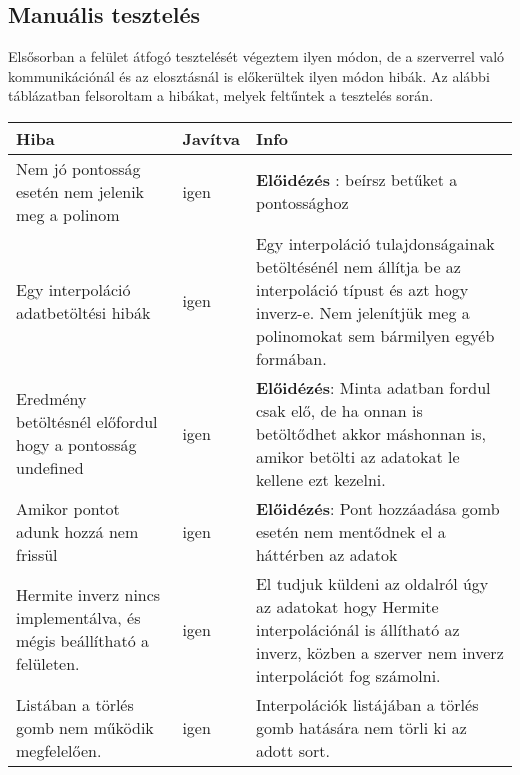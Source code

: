 \subsection{Manuális tesztelés}
	Elsősorban a felület átfogó tesztelését végeztem ilyen módon, de a szerverrel való kommunikációnál és az elosztásnál is előkerültek ilyen módon hibák. \newline
	Az alábbi táblázatban felsoroltam a hibákat, melyek feltűntek a tesztelés során. 
	\begin{center}
  	\begin{tabular}{| p{4cm} | p{1.5cm} | p{8cm} |}
    \hline
    Hiba & Javítva & Info
  	\\ \hline
        Nem jó pontosság esetén nem jelenik meg a polinom
      &
      	igen
      &
		\textbf{Előidézés} : beírsz betűket a pontossághoz 
    \\ \hline
        Egy interpoláció adatbetöltési hibák
      &
      	igen
      &
      	Egy interpoláció tulajdonságainak betöltésénél nem állítja be az interpoláció típust és azt hogy inverz-e.
      	Nem jelenítjük meg a polinomokat sem bármilyen egyéb formában.
    \\ \hline
        Eredmény betöltésnél előfordul hogy a pontosság undefined 
      &
      	igen
      &
		\textbf{Előidézés}:  Minta adatban fordul csak elő, de ha onnan  is betöltődhet akkor máshonnan is, amikor betölti az adatokat le kellene ezt kezelni.
   \\ \hline
    	Amikor pontot adunk hozzá nem frissül 
      &
      	igen
      &
		\textbf{Előidézés}: Pont hozzáadása gomb esetén nem mentődnek el a háttérben az adatok
    \\ \hline
    	Hermite inverz nincs implementálva, és mégis beállítható a felületen.  
      &
      	igen
      &
		El tudjuk küldeni az oldalról úgy az adatokat hogy Hermite interpolációnál is állítható az inverz, közben a szerver nem inverz interpolációt fog számolni.
	\\ \hline
    	Listában a törlés gomb nem működik megfelelően.    
      &
      	igen
      &
		Interpolációk listájában a törlés gomb hatására nem törli ki az adott sort. 
	\\ \hline
  \end{tabular}\end{center}
